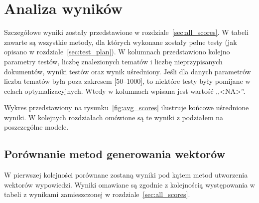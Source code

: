 
\chapter{Analiza wyników}
	Szczegółowe wyniki zostały przedstawione w rozdziale~\ref{sec:all_scores}.
	W tabeli zawarte są wszystkie metody, dla których wykonane zostały pełne testy (jak opisano w rozdziale~\ref{sec:test_plan}).
	W kolumnach przedstawiono kolejno parametry testów, liczbę znalezionych tematów i liczbę nieprzypisanych dokumentów, wyniki testów oraz wynik uśredniony.
	Jeśli dla danych parametrów liczba tematów była poza zakresem [50--1000], to niektóre testy były pomijane w celach optymalizacyjnych.
	Wtedy w kolumnach wpisana jest wartość ,,<NA>''.

	Wykres przedstawiony na rysunku~\ref{fig:avg_scores} ilustruje końcowe uśrednione wyniki.
	W kolejnych rozdziałach omówione są te wyniki z podziałem na poszczególne modele.

\section{Porównanie metod generowania wektorów}
	W pierwszej kolejności porównane zostaną wyniki pod kątem metod utworzenia wektorów wypowiedzi.
	Wyniki omawiane są zgodnie z kolejnością występowania w tabeli z wynikami zamieszczonej w rozdziale~\ref{sec:all_scores}.

